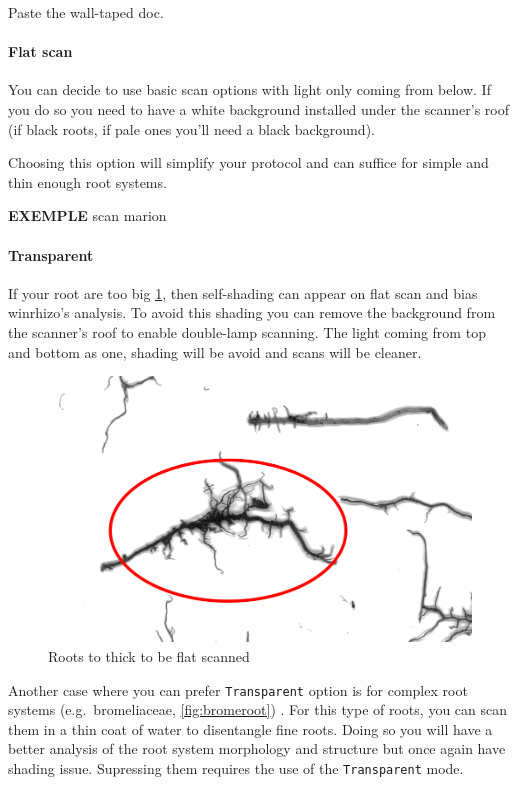 \documentclass[
  12pt,
  american,
  a4paper,
  extrafontsizes,onecolumn,openright
  ]{memoir}
\begin{document}
Paste the wall-taped doc.

\hypertarget{flat-scan}{%
\paragraph{Flat scan}\label{flat-scan}}

You can decide to use basic scan options with light only coming from below. If you do so you need to have a white background installed under the scanner's roof (if black roots, if pale ones you'll need a black background).

Choosing this option will simplify your protocol and can suffice for simple and thin enough root systems.

\textbf{EXEMPLE} scan marion

\hypertarget{transparent}{%
\paragraph{Transparent}\label{transparent}}

If your root are too big \ref{fig:bigroots}, then self-shading can appear on flat scan and bias winrhizo's analysis. To avoid this shading you can remove the background from the scanner's roof to enable double-lamp scanning. The light coming from top and bottom as one, shading will be avoid and scans will be cleaner.

\scriptsize

\begin{figure}

{\centering \includegraphics[width=0.5\linewidth]{document/trait/rootmorpho/thickroot} 

}

\caption{Roots to thick to be flat scanned}\label{fig:bigroots}
\end{figure}

\normalsize

Another case where you can prefer \texttt{Transparent} option is for complex root systems (e.g.~bromeliaceae, \ref{fig:bromeroot}) . For this type of roots, you can scan them in a thin coat of water to disentangle fine roots. Doing so you will have a better analysis of the root system morphology and structure but once again have shading issue. Supressing them requires the use of the \texttt{Transparent} mode.
\end{document}
